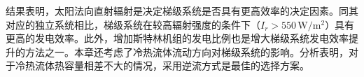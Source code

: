 结果表明，太阳法向直射辐射是决定梯级系统是否具有更高效率的决定因素。同其对应的独立系统相比，梯级系统在较高辐射强度的条件下（$I_r > 550\,\mathrm{W/m^2}$）具有更高的发电效率。此外，增加斯特林机组的发电比例也是增大梯级系统发电效率提升的方法之一。本章还考虑了冷热流体流动方向对梯级系统的影响。分析表明，对于冷热流体热容量相差不大的情况，采用逆流方式是最佳的选择方案。

